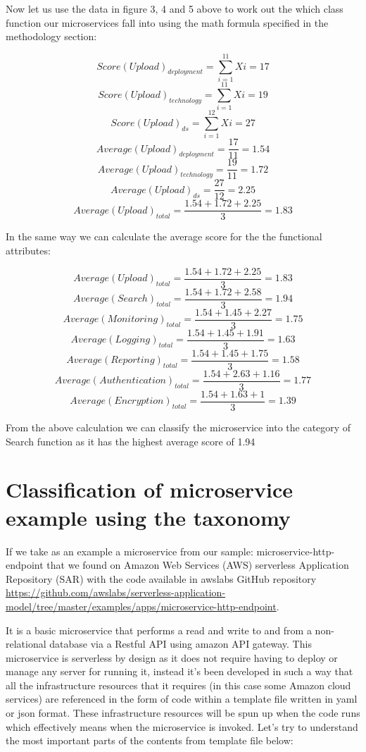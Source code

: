\documentclass{article}
\begin{document}
Now let us use the data in figure 3, 4 and 5 above to work out the which class function our microservices fall into using the math formula specified in the methodology section:

\[Score(Upload)_{deployment}=\sum_{i=1}^{11}Xi = 17\] 
\[Score(Upload)_{technology}=\sum_{i=1}^{11}Xi = 19\] 
\[Score(Upload)_{ds}=\sum_{i=1}^{12}Xi = 27\] 
\[Average(Upload)_{deployment}=\frac{17}{11} = 1.54 \]
\[Average(Upload)_{technology}=\frac{19}{11} = 1.72 \]
\[Average(Upload)_{ds}=\frac{27}{12} = 2.25 \]
\[Average(Upload)_{total}=\frac{1.54 + 1.72 + 2.25}{3} = 1.83\]

In the same way we can calculate the average score for the the functional attributes:

\[Average(Upload)_{total}=\frac{1.54 + 1.72 + 2.25}{3} = 1.83\]
\[Average(Search)_{total}=\frac{1.54 + 1.72 + 2.58}{3} = 1.94\]
\[Average(Monitoring)_{total}=\frac{1.54 + 1.45 + 2.27}{3} = 1.75\]
\[Average(Logging)_{total}=\frac{1.54 + 1.45 + 1.91}{3} = 1.63\]
\[Average(Reporting)_{total}=\frac{1.54 + 1.45 + 1.75}{3} = 1.58\]
\[Average(Authentication)_{total}=\frac{1.54 + 2.63 + 1.16}{3} = 1.77\]
\[Average(Encryption)_{total}=\frac{1.54 + 1.63 + 1}{3} = 1.39\]

From the above calculation we can classify the microservice into the category of Search function as it has the highest average score of 1.94

\section{Classification of microservice example using the taxonomy}

If we take as an example a microservice from our sample: microservice-http-endpoint that we found on Amazon Web Services (AWS) serverless Application Repository (SAR) with the code available in awslabs GitHub repository \url{https://github.com/awslabs/serverless-application-model/tree/master/examples/apps/microservice-http-endpoint}.

It is a basic microservice that performs a read and write to and from a non-relational database via a Restful API using amazon API gateway. This microservice is serverless by design as it does not require having to deploy or manage any server for running it, instead it’s been developed in such a way that all the infrastructure resources that it requires (in this case some Amazon cloud services) are referenced in the form of code within a template file written in yaml or json format. These infrastructure resources will be spun up when the code runs which effectively means when the microservice is invoked. Let’s try to understand the most important parts of the contents from template file below:
\end{document}
